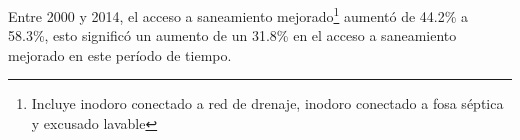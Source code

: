  Entre 2000 y 2014, el acceso a saneamiento mejorado\footnote{Incluye inodoro conectado a red de drenaje, inodoro conectado a fosa séptica y excusado lavable} aumentó de 44.2\% a 58.3\%, esto significó un aumento de un 31.8\% en el acceso a saneamiento mejorado en este período de tiempo.